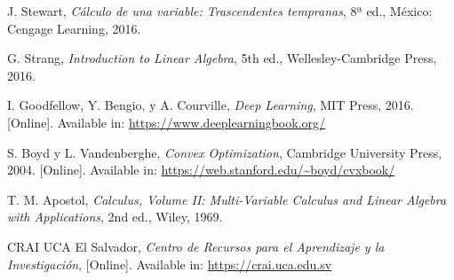 \documentclass[12pt, letterpaper,conference]{IEEEtran}
\begin{document}
\begin{thebibliography}{99}
J. Stewart, \textit{Cálculo de una variable: Trascendentes tempranas}, 8ª ed., México: Cengage Learning, 2016.

G. Strang, \textit{Introduction to Linear Algebra}, 5th ed., Wellesley-Cambridge Press, 2016.

I. Goodfellow, Y. Bengio, y A. Courville, \textit{Deep Learning}, MIT Press, 2016. [Online]. Available in: \url{https://www.deeplearningbook.org/}

S. Boyd y L. Vandenberghe, \textit{Convex Optimization}, Cambridge University Press, 2004. [Online]. Available in: \url{https://web.stanford.edu/~boyd/cvxbook/}

T. M. Apostol, \textit{Calculus, Volume II: Multi-Variable Calculus and Linear Algebra with Applications}, 2nd ed., Wiley, 1969.



CRAI UCA El Salvador, \textit{Centro de Recursos para el Aprendizaje y la Investigación}, [Online]. Available in: \url{https://crai.uca.edu.sv}


\end{thebibliography}
\end{document}

